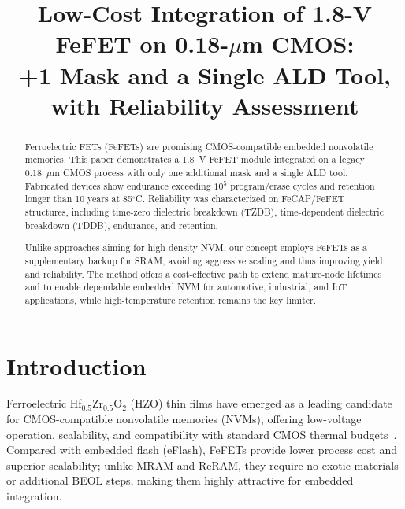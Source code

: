\documentclass[conference]{IEEEtran}
\begin{document}
\title{Low-Cost Integration of 1.8-V FeFET on 0.18-$\mu$m CMOS:\\
+1 Mask and a Single ALD Tool, with Reliability Assessment}

\author{
}

\maketitle

\begin{abstract}
Ferroelectric FETs (FeFETs) are promising CMOS-compatible embedded nonvolatile memories. 
This paper demonstrates a 1.8~V FeFET module integrated on a legacy 0.18~$\mu$m CMOS process with only one additional mask and a single ALD tool. 
Fabricated devices show endurance exceeding $10^5$ program/erase cycles and retention longer than 10 years at 85$^\circ$C. 
Reliability was characterized on FeCAP/FeFET structures, including time-zero dielectric breakdown (TZDB), time-dependent dielectric breakdown (TDDB), endurance, and retention. 

Unlike approaches aiming for high-density NVM, our concept employs FeFETs as a supplementary backup for SRAM, avoiding aggressive scaling and thus improving yield and reliability. 
The method offers a cost-effective path to extend mature-node lifetimes and to enable dependable embedded NVM for automotive, industrial, and IoT applications, while high-temperature retention remains the key limiter.
\end{abstract}

\section{Introduction}
Ferroelectric Hf$_{0.5}$Zr$_{0.5}$O$_2$ (HZO) thin films have emerged as a leading candidate for CMOS-compatible nonvolatile memories (NVMs), 
offering low-voltage operation, scalability, and compatibility with standard CMOS thermal budgets~\cite{boscke2011,mueller2012,mikolajick2019,mueller2015}.
Compared with embedded flash (eFlash), FeFETs provide lower process cost and superior scalability; 
unlike MRAM and ReRAM, they require no exotic materials or additional BEOL steps, making them highly attractive for embedded integration.
\end{document}
